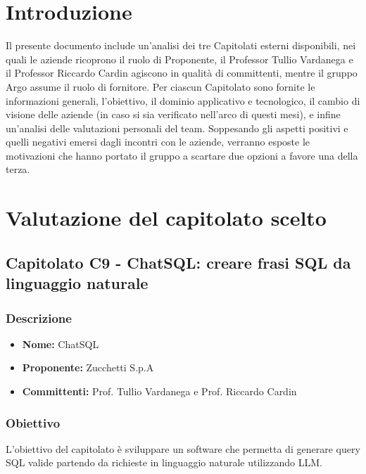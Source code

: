 





\makeFrontPage


\clearpage

\tableofcontents
\clearpage

\section{Introduzione}
Il presente documento include un'analisi dei tre Capitolati esterni disponibili, nei quali le aziende ricoprono il ruolo di Proponente, il Professor Tullio Vardanega e il Professor Riccardo Cardin agiscono in qualità di committenti, mentre il gruppo Argo assume il ruolo di fornitore. Per ciascun Capitolato sono fornite le informazioni generali, l’obiettivo, il dominio applicativo e tecnologico, il cambio di visione delle aziende (in caso si sia verificato nell’arco di questi mesi), e infine un’analisi delle valutazioni personali del team. Soppesando gli aspetti positivi e quelli negativi emersi dagli incontri con le aziende, verranno esposte le motivazioni che hanno portato il gruppo a scartare due opzioni a favore una della terza. 

\section{Valutazione del capitolato scelto}

\subsection{Capitolato C9 - ChatSQL: creare frasi SQL da linguaggio naturale}

\subsubsection{Descrizione}
\begin{itemize}
  \item \textbf{Nome:} ChatSQL
  \item \textbf{Proponente:} Zucchetti S.p.A
  \item \textbf{Committenti:} Prof. Tullio Vardanega e Prof. Riccardo Cardin
\end{itemize}

\subsubsection{Obiettivo}
L’obiettivo del capitolato è sviluppare un software che permetta di generare query SQL valide partendo da richieste in linguaggio naturale utilizzando LLM. 

